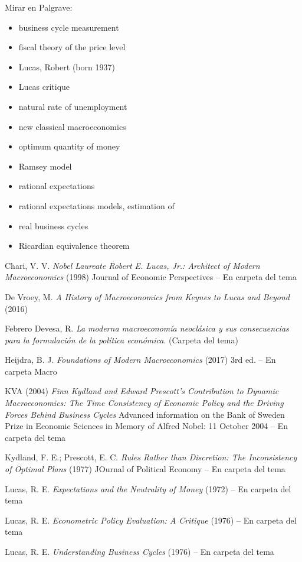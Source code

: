 \documentclass{nuevotema}
\begin{document}
Mirar en Palgrave:
\begin{itemize}
	\item business cycle measurement
	\item fiscal theory of the price level
	\item Lucas, Robert (born 1937)
	\item Lucas critique
	\item natural rate of unemployment
	\item new classical macroeconomics
	\item optimum quantity of money
	\item Ramsey model
	\item rational expectations
	\item rational expectations models, estimation of
	\item real business cycles
	\item Ricardian equivalence theorem
	
\end{itemize}

Chari, V. V. \textit{Nobel Laureate Robert E. Lucas, Jr.: Architect of Modern Macroeconomics} (1998) Journal of Economic Perspectives -- En carpeta del tema

De Vroey, M. \textit{A History of Macroeconomics from Keynes to Lucas and Beyond} (2016)

Febrero Devesa, R. \textit{La moderna macroeconomía neoclásica y sus consecuencias para la formulación de la política económica}. (Carpeta del tema)

Heijdra, B. J. \textit{Foundations of Modern Macroeconomics} (2017) 3rd ed. -- En carpeta Macro

KVA (2004) \textit{Finn Kydland and Edward Prescott's Contribution to Dynamic Macroeconomics: The Time Consistency of Economic Policy and the Driving Forces Behind Business Cycles} Advanced information on the Bank of Sweden Prize in Economic Sciences in Memory of Alfred Nobel: 11 October 2004 -- En carpeta del tema

Kydland, F. E.; Prescott, E. C. \textit{Rules Rather than Discretion: The Inconsistency of Optimal Plans} (1977) JOurnal of Political Economy -- En carpeta del tema

Lucas, R. E. \textit{Expectations and the Neutrality of Money} (1972) -- En carpeta del tema

Lucas, R. E. \textit{Econometric Policy Evaluation: A Critique} (1976) -- En carpeta del tema

Lucas, R. E. \textit{Understanding Business Cycles} (1976) -- En carpeta del tema
\end{document}
